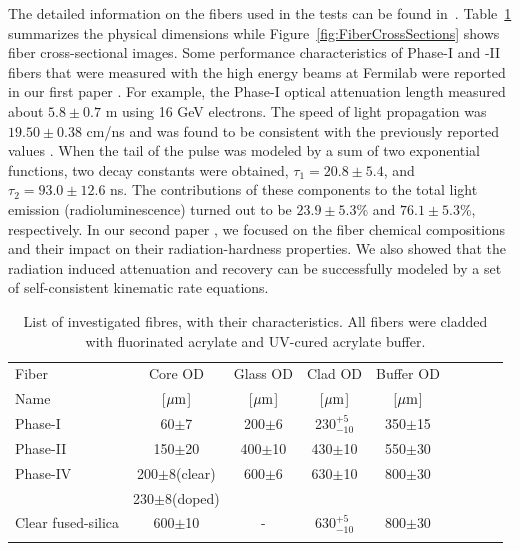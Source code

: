 \documentclass[a4paper,11pt]{article}
\begin{document}
The detailed information on the fibers used in the tests can be found in~\cite{JINSTPaper}.  Table~\ref{tab:fiberlist} summarizes the physical dimensions while Figure~\ref{fig:FiberCrossSections} shows fiber cross-sectional images.  Some performance characteristics of Phase-I and -II fibers that were measured with the high energy beams at Fermilab were reported in our first paper \cite{JINSTPaper}.  For example, the Phase-I optical attenuation length measured about $5.8\pm0.7$ m using 16 GeV  electrons.  The speed of light propagation was $19.50\pm0.38$ cm/ns and was found to be consistent with the previously reported values \cite{Goro,Akch97}.  When the tail of the pulse was modeled by a sum of two exponential functions, two decay constants were obtained, $\tau_1= 20.8\pm5.4$, and $\tau_2= 93.0\pm12.6$ ns.  The contributions of these components to the total light emission (radioluminescence) turned out to be $23.9\pm5.3$\% and $76.1\pm5.3$\%, respectively.  In our second paper \cite{JINSTPaper}, we focused on the fiber chemical compositions and their impact on their radiation-hardness properties.  We also showed that the radiation induced attenuation and recovery can be successfully modeled by a set of self-consistent kinematic rate equations.

\begin{table}[htp]
\caption{\small List of investigated fibres, with their characteristics. All fibers were cladded with fluorinated acrylate and UV-cured acrylate buffer.}
\vspace{-2 mm}
\begin{center}
{\small
\begin{tabular}{|l|c|c|c|c|c|c|c|c|} \hline
Fiber              &  Core OD            & Glass OD        & Clad OD          & Buffer  OD        \\
Name               &[${\rm \mu m}$]      & [${\rm \mu m}$] & [${\rm \mu m}$]  & [${\rm \mu m}$]   \\
\hline
Phase-I            & 60$\pm$7            &	200$\pm$6      & 230$^{+5}_{-10}$ &	350$\pm$15        \\
Phase-II           & 150$\pm$20		     &	400$\pm$10     & 430$\pm$10	      &	550$\pm$30        \\
Phase-IV           & 200$\pm$8(clear)   &	600$\pm$6	   & 630$\pm$10       &	800$\pm$30        \\
                          & 230$\pm$8(doped) &	   &     &	         \\
Clear fused-silica & 600$\pm$10          &-				   & 630$^{+5}_{-10}$ &	800$\pm$30	      \\
                    &                     &                &                  & \\
\hline
\end{tabular}
}
\end{center}
\label{tab:fiberlist}
\end{table}
\end{document}
